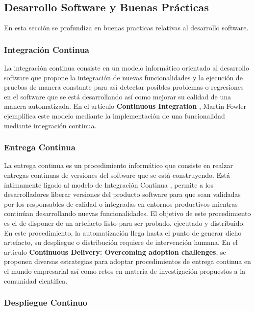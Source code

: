 \documentclass[a4paper,11pt]{book}
\begin{document}
\subsection{Desarrollo Software y Buenas Prácticas }

En esta sección se profundiza en buenas practicas relativas al desarrollo software.

\subsubsection{Integración Continua}
 
La integración continua consiste en un modelo informático orientado al desarrollo software que propone la integración de nuevas funcionalidades y la ejecución de pruebas de manera constante para así detectar posibles problemas o regresiones en el software que se está desarrollando así como mejorar su calidad de una manera automatizada. En el artículo \textbf{Continuous Integration}\cite{ci} ,  Martin Fowler ejemplifica este modelo mediante la implementación de una funcionalidad mediante integración continua. 

\subsubsection{Entrega Continua}

La entrega continua es un procedimiento informático que consiste en realzar entregas continuas de versiones del software que se está construyendo. Está íntimamente ligado al modelo de Integración Continua , permite a los desarrolladores liberar versiones del producto software para que sean validadas por los responsables de calidad o integradas en entornos productivos mientras continúan desarrollando nuevas funcionalidades. El objetivo de este procedimiento es el de disponer de un artefacto listo para ser probado, ejecutado y distribuido.  En este procedimiento, la automatización llega hasta el punto de generar dicho artefacto, su despliegue o distribución requiere de intervención humana. En el articulo \textbf{Continuous Delivery: Overcoming adoption challenges}\cite{cd}, se proponen diversas estrategias para adoptar procedimientos de entrega continua  en el mundo empresarial así como retos en materia de investigación propuestos a la comunidad científica. 

\subsubsection{Despliegue Continuo}
\end{document}
